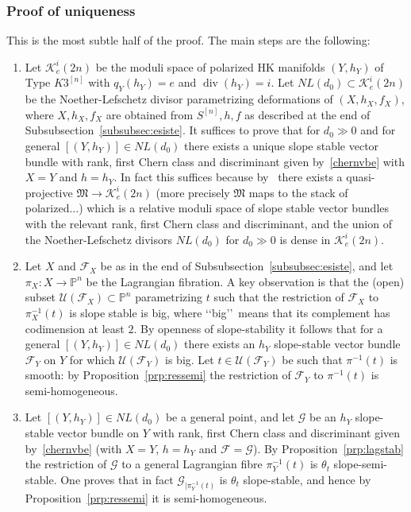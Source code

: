\documentclass[11pt]{amsart}
\newcommand{\PP}{{\mathbb P}}
\let\mathcal\mathscr
\def\cF{\mathcal{F}}
\def\cG{\mathcal{G}}
\def\cK{\mathcal{K}}
\def\cU{\mathcal{U}}
\DeclareMathOperator{\divisore}{div}
\theoremstyle{definition}
\theoremstyle{remark}
\begin{document}
\subsubsection{Proof of uniqueness}\label{subsubsec:unico}
%
This is the most subtle half of the proof. The main steps are the following:
%
\begin{enumerate}
%
\item
%
Let $\cK_e^i(2n)$ be the moduli space of polarized HK manifolds $(Y,h_Y)$ of Type $K3^{[n]}$ with  $q_{Y}(h_Y)=e$ and $\divisore(h_Y)=i$. Let  
$NL(d_0)\subset\cK_e^i(2n)$ be the Noether-Lefschetz divisor parametrizing deformations of $(X,h_X,f_X)$, where $X,h_X,f_X$ are obtained from $S^{[n]},h,f$ as described at the end of Subsubsection~\ref{subsubsec:esiste}. It suffices to prove that for $d_0\gg 0$ and for general 
$[(Y,h_Y)]\in NL(d_0)$ there exists a unique slope stable vector bundle with rank, first Chern class and discriminant given by~\eqref{chernvbe} 
with $X=Y$ and $h=h_Y$. In fact this suffices because by~\cite{maruyama:fascilimitati} there exists a quasi-projective  
${\mathfrak M}\to \cK_e^i(2n)$ (more precisely ${\mathfrak M}$ maps to the stack of polarized...) which is a relative moduli space of slope stable vector bundles with the relevant 
rank, first Chern class and discriminant, and the union of the Noether-Lefschetz divisors $NL(d_0)$ for $d_0\gg 0$ is dense in $\cK_e^i(2n)$.
%
\item
%
Let $X$ and $\cF_X$ be as in  the end of Subsubsection~\ref{subsubsec:esiste}, and let $\pi_X\colon X\to\PP^n$ be the Lagrangian fibration. A key observation is that the (open) subset  $\cU(\cF_X)\subset\PP^n$ parametrizing $t$ such that the restriction of $\cF_X$ to $\pi_X^{-1}(t)$ is slope stable is big, where \lq\lq big\rq\rq\ means that its complement has codimension at least $2$. By openness of slope-stability it follows that for a general $[(Y,h_Y)]\in NL(d_0)$ there exists an $h_Y$ slope-stable  vector bundle $\cF_Y$ on $Y$ for which $\cU(\cF_Y)$ is big. Let 
$t\in\cU(\cF_Y)$ be such that $\pi^{-1}(t)$ is smooth: by Proposition~\ref{prp:ressemi} the restriction of $\cF_Y$ to  $\pi^{-1}(t)$ is semi-homogeneous.  
%
\item
%
Let $[(Y,h_Y)]\in NL(d_0)$ be a general point, and let $\cG$ be an $h_Y$ slope-stable vector bundle on $Y$ with rank, first Chern class and discriminant given by~\eqref{chernvbe} 
(with $X=Y$, $h=h_Y$ and $\cF=\cG$). By Proposition~\ref{prp:lagstab} the restriction of $\cG$ to a general Lagrangian fibre $\pi_Y^{-1}(t)$ is 
$\theta_t$ slope-semi-stable. One proves that in fact $\cG_{|\pi_Y^{-1}(t)}$ is $\theta_t$ slope-stable, and hence  by Proposition~\ref{prp:ressemi} it is semi-homogeneous.  

\end{enumerate}
\end{document}
